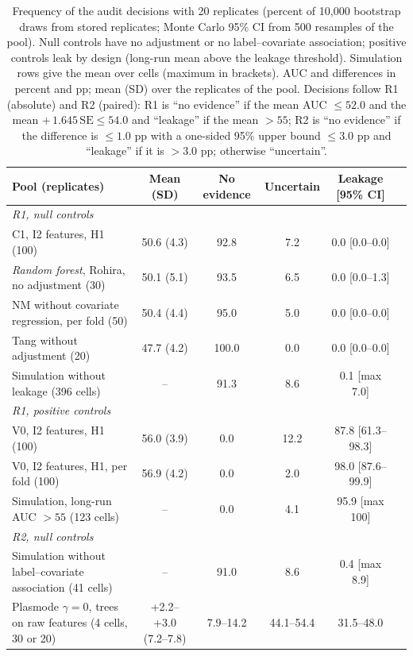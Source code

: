 \begin{table}[t]
\caption{Frequency of the audit decisions with 20 replicates (percent of 10,000 bootstrap draws from stored replicates; Monte Carlo 95\% CI from 500 resamples of the pool). Null controls have no adjustment or no label--covariate association; positive controls leak by design (long-run mean above the leakage threshold). Simulation rows give the mean over cells (maximum in brackets). AUC and differences in percent and pp; mean (SD) over the replicates of the pool. Decisions follow R1 (absolute) and R2 (paired): R1 is ``no evidence'' if the mean AUC $\leq 52.0$ and the mean $+\,1.645\,\mathrm{SE} \leq 54.0$ and ``leakage'' if the mean $> 55$; R2 is ``no evidence'' if the difference is $\leq 1.0$ pp with a one-sided 95\% upper bound $\leq 3.0$ pp and ``leakage'' if it is $> 3.0$ pp; otherwise ``uncertain''.}\label{tab:oc}
\centering\scriptsize
\setlength{\tabcolsep}{2.5pt}
\begin{tabular}{p{}ccccc}
\toprule
Pool (replicates) & Mean (SD) & No evidence & Uncertain & Leakage [95\% CI] \\
\midrule
\multicolumn{5}{l}{\textit{R1, null controls}} \\
C1, I2 features, H1 (100) & 50.6 (4.3) & 92.8 & 7.2 & 0.0 [0.0--0.0] \\
\textit{Random forest}, Rohira, no adjustment (30) & 50.1 (5.1) & 93.5 & 6.5 & 0.0 [0.0--1.3] \\
NM without covariate regression, per fold (50) & 50.4 (4.4) & 95.0 & 5.0 & 0.0 [0.0--0.0] \\
Tang without adjustment (20) & 47.7 (4.2) & 100.0 & 0.0 & 0.0 [0.0--0.0] \\
Simulation without leakage (396 cells) & -- & 91.3 & 8.6 & 0.1 [max 7.0] \\
\multicolumn{5}{l}{\textit{R1, positive controls}} \\
V0, I2 features, H1 (100) & 56.0 (3.9) & 0.0 & 12.2 & 87.8 [61.3--98.3] \\
V0, I2 features, H1, per fold (100) & 56.9 (4.2) & 0.0 & 2.0 & 98.0 [87.6--99.9] \\
Simulation, long-run AUC $>55$ (123 cells) & -- & 0.0 & 4.1 & 95.9 [max 100] \\
\multicolumn{5}{l}{\textit{R2, null controls}} \\
Simulation without label--covariate association (41 cells) & -- & 91.0 & 8.6 & 0.4 [max 8.9] \\
Plasmode $\gamma=0$, trees on raw features (4 cells, 30 or 20) & +2.2--+3.0 (7.2--7.8) & 7.9--14.2 & 44.1--54.4 & 31.5--48.0 \\

\end{tabular}
\end{table}
